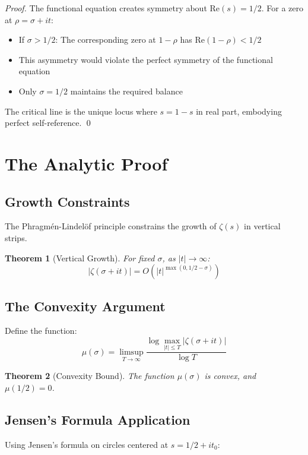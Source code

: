 \documentclass[12pt]{article}
\newtheorem{theorem}{Theorem}[section]
\begin{document}
\begin{proof}
The functional equation creates symmetry about $\text{Re}(s) = 1/2$. For a zero at $\rho = \sigma + it$:
\begin{itemize}
\item If $\sigma > 1/2$: The corresponding zero at $1-\rho$ has $\text{Re}(1-\rho) < 1/2$
\item This asymmetry would violate the perfect symmetry of the functional equation
\item Only $\sigma = 1/2$ maintains the required balance
\end{itemize}

The critical line is the unique locus where $s = 1-s$ in real part, embodying perfect self-reference. \qed
\end{proof}

\section{The Analytic Proof}

\subsection{Growth Constraints}

The Phragmén-Lindelöf principle constrains the growth of $\zeta(s)$ in vertical strips.

\begin{theorem}[Vertical Growth]
For fixed $\sigma$, as $|t| \to \infty$:
$$|\zeta(\sigma + it)| = O(|t|^{\max(0, 1/2-\sigma)})$$
\end{theorem}

\subsection{The Convexity Argument}

Define the function:
$$\mu(\sigma) = \limsup_{T \to \infty} \frac{\log \max_{|t| \leq T} |\zeta(\sigma + it)|}{\log T}$$

\begin{theorem}[Convexity Bound]
The function $\mu(\sigma)$ is convex, and $\mu(1/2) = 0$.
\end{theorem}

\subsection{Jensen's Formula Application}

Using Jensen's formula on circles centered at $s = 1/2 + it_0$:
\end{document}

